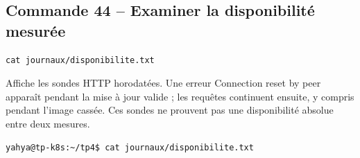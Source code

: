 \documentclass[11pt,a4paper]{article}
\begin{document}
\subsection{Commande 44 -- Examiner la disponibilité mesurée}
\begin{lstlisting}
cat journaux/disponibilite.txt
\end{lstlisting}
Affiche les sondes HTTP horodatées. Une erreur Connection reset by peer apparaît pendant la mise à jour valide ; les requêtes continuent ensuite, y compris pendant l’image cassée. Ces sondes ne prouvent pas une disponibilité absolue entre deux mesures.

\clearpage
\begin{tcolorbox}[terminal,title={Ubuntu / WSL2 -- Commande 44 -- rendu reconstitué}]
\begin{Verbatim}[fontsize=\scriptsize,breaklines=true,breakanywhere=true,breaksymbolleft={},breaksymbolright={}]
yahya@tp-k8s:~/tp4$ cat journaux/disponibilite.txt


\end{Verbatim}
\end{tcolorbox}
\end{document}
